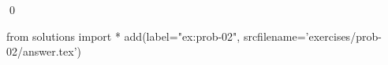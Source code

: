 
\begin{ex} 
  \label{ex:prob-02}
  
  \qed
\end{ex} 
\begin{python0}
from solutions import *
add(label="ex:prob-02",
    srcfilename='exercises/prob-02/answer.tex') 
\end{python0}
